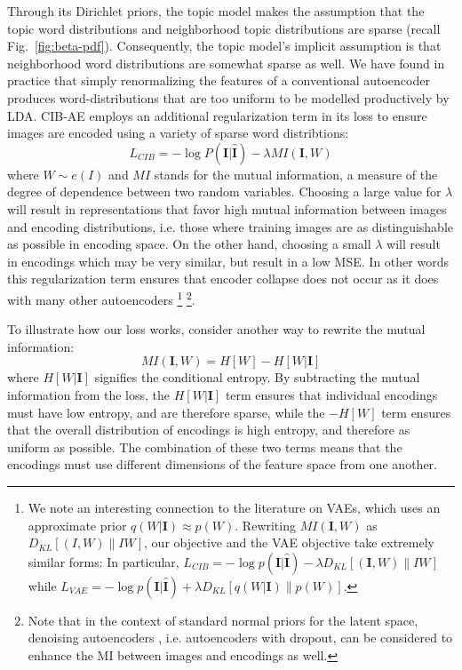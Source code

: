 Through its Dirichlet priors, the topic model makes the assumption that the topic word distributions and neighborhood topic distributions are sparse (recall Fig.~\ref{fig:beta-pdf}). Consequently, the topic model's implicit assumption is that neighborhood word distributions are somewhat sparse as well.
We have found in practice that simply renormalizing the features of a conventional autoencoder produces word-distributions that are too uniform to be modelled productively by LDA. CIB-AE employs an additional regularization term in its loss to ensure images are encoded using a variety of sparse word distribtions:
\begin{equation}
    L_{CIB} = -\log P(\mathbf{I} | \mathbf{\hat{I}}) - \lambda MI\left(\mathbf{I}, W\right)
\end{equation}
where $W \sim e(I)$ and $MI$ stands for the mutual information, a measure of the degree of dependence between two random variables. Choosing a large value for $\lambda$ will result in representations that favor high mutual information between images and encoding distributions, i.e. those where training images are as distinguishable as possible in encoding space. On the other hand, choosing a small $\lambda$ will result in encodings which may be very similar, but result in a low MSE. In other words this regularization term ensures that encoder collapse does not occur as it does with many other autoencoders \footnote{We note an interesting connection to the literature on VAEs, which uses an approximate prior $q(W|\mathbf{I}) \approx p(W)$. Rewriting $MI\left(\mathbf{I}, W\right)$ as $D_{KL}[(I,W) \| IW ]$, our objective and the VAE objective take extremely similar forms: In particular, $L_{CIB} = -\log p(\mathbf{I} | \mathbf{\hat{I}}) - \lambda D_{KL}[(\mathbf{I},W) \| IW ]$ while $L_{VAE} = -\log p(\mathbf{I} | \mathbf{\hat{I}}) + \lambda D_{KL}[q(W|\mathbf{I}) \| p(W) ]$.} \footnote{Note that in the context of standard normal priors for the latent space, denoising autoencoders \citep{vincent2010stacked}, i.e. autoencoders with dropout, can be considered to enhance the MI between images and encodings as well.}.

To illustrate how our loss works, consider another way to rewrite the mutual information:
\begin{equation}
MI\left(\mathbf{I}, W\right) = H[W] - H[W | \mathbf{I}]
\end{equation}
where $H[W | \mathbf{I}]$ signifies the conditional entropy. By subtracting the mutual information from the loss, the $H[W | \mathbf{I}]$ term ensures that individual encodings must have low entropy, and are therefore sparse, while the $-H[W]$ term ensures that the overall distribution of encodings is high entropy, and therefore as uniform as possible. The combination of these two terms means that the encodings must use different dimensions of the feature space from one another.

